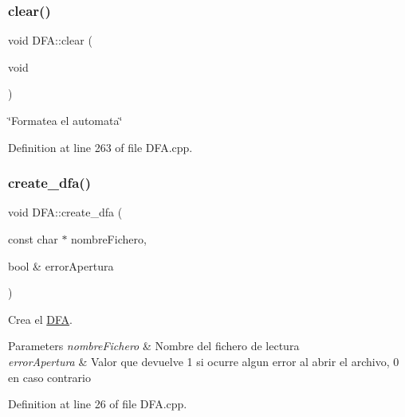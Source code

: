 \mbox{\label{class_d_f_a_a2abcdde01c9833f97b99c9d1c7e739aa}} 
\subsubsection{\texorpdfstring{clear()}{clear()}}
{\footnotesize\ttfamily void D\+F\+A\+::clear (\begin{DoxyParamCaption}\item[{void}]{ }\end{DoxyParamCaption})}



\char`\"{}\+Formatea el automata\char`\"{} 



Definition at line 263 of file D\+F\+A.\+cpp.

\mbox{\label{class_d_f_a_a31d1ae734a752f28753d5fa3031c4f0c}} 
\subsubsection{\texorpdfstring{create\+\_\+dfa()}{create\_dfa()}\hspace{0.1cm}{\footnotesize\ttfamily [1/2]}}
{\footnotesize\ttfamily void D\+F\+A\+::create\+\_\+dfa (\begin{DoxyParamCaption}\item[{const char $\ast$}]{nombre\+Fichero,  }\item[{bool \&}]{error\+Apertura }\end{DoxyParamCaption})}



Crea el \hyperlink{class_d_f_a}{D\+FA}. 


\begin{DoxyParams}{Parameters}
{\em nombre\+Fichero} & Nombre del fichero de lectura \\
\hline
{\em error\+Apertura} & Valor que devuelve 1 si ocurre algun error al abrir el archivo, 0 en caso contrario \\
\hline
\end{DoxyParams}


Definition at line 26 of file D\+F\+A.\+cpp.

\mbox{\label{class_d_f_a_a06e28de0df3c54afe35ecebe60e88484}} 
